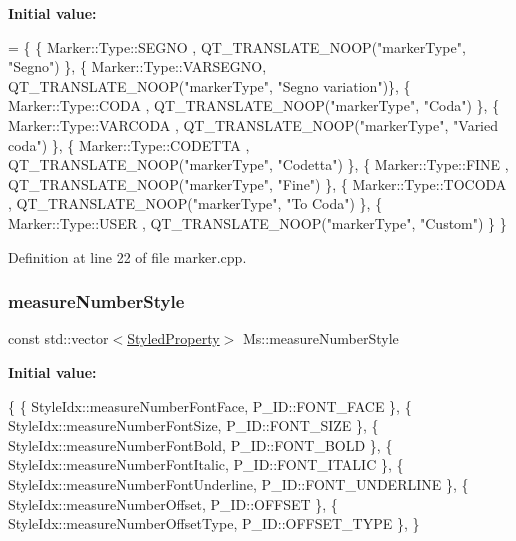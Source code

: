 {\bfseries Initial value\+:}
\begin{DoxyCode}
= \{
      \{ Marker::Type::SEGNO   , QT\_TRANSLATE\_NOOP(\textcolor{stringliteral}{"markerType"}, \textcolor{stringliteral}{"Segno"})          \},
      \{ Marker::Type::VARSEGNO, QT\_TRANSLATE\_NOOP(\textcolor{stringliteral}{"markerType"}, \textcolor{stringliteral}{"Segno variation"})\},
      \{ Marker::Type::CODA    , QT\_TRANSLATE\_NOOP(\textcolor{stringliteral}{"markerType"}, \textcolor{stringliteral}{"Coda"})           \},
      \{ Marker::Type::VARCODA , QT\_TRANSLATE\_NOOP(\textcolor{stringliteral}{"markerType"}, \textcolor{stringliteral}{"Varied coda"})    \},
      \{ Marker::Type::CODETTA , QT\_TRANSLATE\_NOOP(\textcolor{stringliteral}{"markerType"}, \textcolor{stringliteral}{"Codetta"})        \},
      \{ Marker::Type::FINE    , QT\_TRANSLATE\_NOOP(\textcolor{stringliteral}{"markerType"}, \textcolor{stringliteral}{"Fine"})           \},
      \{ Marker::Type::TOCODA  , QT\_TRANSLATE\_NOOP(\textcolor{stringliteral}{"markerType"}, \textcolor{stringliteral}{"To Coda"})        \},
      \{ Marker::Type::USER    , QT\_TRANSLATE\_NOOP(\textcolor{stringliteral}{"markerType"}, \textcolor{stringliteral}{"Custom"})         \}
      \}
\end{DoxyCode}


Definition at line 22 of file marker.\+cpp.

\mbox{\label{namespace_ms_ae558e283ec27cce59f34c45128cbfaf2}} 
\subsubsection{\texorpdfstring{measure\+Number\+Style}{measureNumberStyle}}
{\footnotesize\ttfamily const std\+::vector$<$\hyperlink{struct_ms_1_1_styled_property}{Styled\+Property}$>$ Ms\+::measure\+Number\+Style}

{\bfseries Initial value\+:}
\begin{DoxyCode}
\{
      \{ StyleIdx::measureNumberFontFace,              P\_ID::FONT\_FACE              \},
      \{ StyleIdx::measureNumberFontSize,              P\_ID::FONT\_SIZE              \},
      \{ StyleIdx::measureNumberFontBold,              P\_ID::FONT\_BOLD              \},
      \{ StyleIdx::measureNumberFontItalic,            P\_ID::FONT\_ITALIC            \},
      \{ StyleIdx::measureNumberFontUnderline,         P\_ID::FONT\_UNDERLINE         \},
      \{ StyleIdx::measureNumberOffset,                P\_ID::OFFSET                 \},
      \{ StyleIdx::measureNumberOffsetType,            P\_ID::OFFSET\_TYPE            \},
      \}
\end{DoxyCode}


